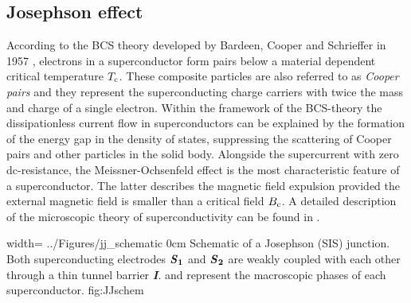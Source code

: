         
\subsection{Josephson effect}\label{subchap_Jeffect}

According to the BCS theory developed by Bardeen, Cooper and Schrieffer in 1957 \cite{Bardeen1957}, electrons in a superconductor form pairs below a material dependent critical temperature $T_{\rm c}$. These composite particles are also referred to as \textit{Cooper pairs} and they represent the superconducting charge carriers with twice the mass and charge of a single electron. Within the framework of the BCS-theory the dissipationless current flow in superconductors can be explained by the formation of the energy gap in the density of states, suppressing the scattering of Cooper pairs and other particles in the solid body. Alongside the supercurrent with zero dc-resistance, the Meissner-Ochsenfeld effect \cite{Meissner1933} is the most characteristic feature of a superconductor. The latter describes the magnetic field expulsion provided the external magnetic field is smaller than a critical field $B_{\rm c}$. A detailed description of the microscopic theory of superconductivity can be found in \cite{deGennes1964}.

{width=\textwidth}
{../Figures/jj_schematic}
{0cm}
{Schematic of a Josephson (SIS) junction. Both superconducting electrodes $\textbf{\textit{S}}_\textbf{1}$ and $\textbf{\textit{S}}_\textbf{2}$ are weakly coupled with each other through a thin tunnel barrier \textbf{\textit{I}}.  and  represent the macroscopic phases of each superconductor.} 
{fig:JJschem}

